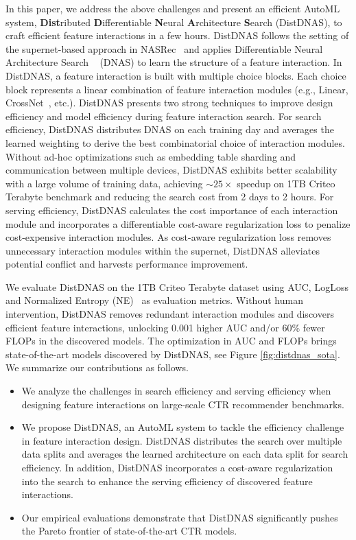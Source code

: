 In this paper, we address the above challenges and present an efficient AutoML system, \textbf{Dist}ributed \textbf{D}ifferentiable \textbf{N}eural \textbf{A}rchitecture \textbf{S}earch (DistDNAS), to craft efficient feature interactions in a few hours. 
DistDNAS follows the setting of the supernet-based approach in NASRec~\cite{zhang2022nasrec} and applies Differentiable Neural Architecture Search ~\cite{liu2018darts} (DNAS) to learn the structure of a feature interaction. 
In DistDNAS, a feature interaction is built with multiple choice blocks. 
Each choice block represents a linear combination of feature interaction modules (e.g., Linear, CrossNet~\cite{wang2021dcn}, etc.).
DistDNAS presents two strong techniques to improve design efficiency and model efficiency during feature interaction search.
For search efficiency, DistDNAS distributes DNAS on each training day and averages the learned weighting to derive the best combinatorial choice of interaction modules.
Without ad-hoc optimizations such as embedding table sharding and communication between multiple devices, DistDNAS exhibits better scalability with a large volume of training data, achieving $\sim25\times$ speedup on 1TB Criteo Terabyte benchmark and reducing the search cost from 2 days to 2 hours.
For serving efficiency, DistDNAS calculates the cost importance of each interaction module and incorporates a differentiable cost-aware regularization loss to penalize cost-expensive interaction modules.
As cost-aware regularization loss removes unnecessary interaction modules within the supernet, DistDNAS alleviates potential conflict and harvests performance improvement. 

We evaluate DistDNAS on the 1TB Criteo Terabyte dataset using AUC, LogLoss and Normalized Entropy (NE)~\cite{he2014practical} as evaluation metrics.
Without human intervention, DistDNAS removes redundant interaction modules and discovers efficient feature interactions, unlocking 0.001 higher AUC and/or 60\% fewer FLOPs in the discovered models. The optimization in AUC and FLOPs brings state-of-the-art models discovered by DistDNAS, see Figure \ref{fig:distdnas_sota}. We summarize our contributions as follows.
\begin{itemize}[noitemsep,leftmargin=*]
    \item We analyze the challenges in search efficiency and serving efficiency when designing feature interactions on large-scale CTR recommender benchmarks.
    \item We propose DistDNAS, an AutoML system to tackle the efficiency challenge in feature interaction design. DistDNAS distributes the search over multiple data splits and averages the learned architecture on each data split for search efficiency. In addition, DistDNAS incorporates a cost-aware regularization into the search to enhance the serving efficiency of discovered feature interactions.
    \item Our empirical evaluations demonstrate that DistDNAS significantly pushes the Pareto frontier of state-of-the-art CTR models.
\end{itemize}